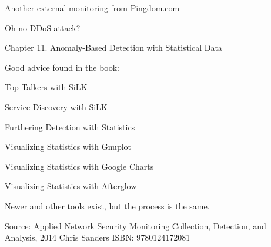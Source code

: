 \documentclass[Screen16to9,17pt]{foils}
\begin{document}


\centerline{Another external monitoring from Pingdom.com}





\centerline{Oh no DDoS attack?}




Chapter 11. Anomaly-Based Detection with Statistical Data

Good advice found in the book:
\begin{list2}
\item Top Talkers with SiLK
\item Service Discovery with SiLK
\item Furthering Detection with Statistics
\item Visualizing Statistics with Gnuplot
\item Visualizing Statistics with Google Charts
\item Visualizing Statistics with Afterglow
\end{list2}

Newer and other tools exist, but the process is the same.

Source: Applied Network Security Monitoring Collection, Detection, and Analysis, 2014 Chris Sanders ISBN: 9780124172081


\end{document}
